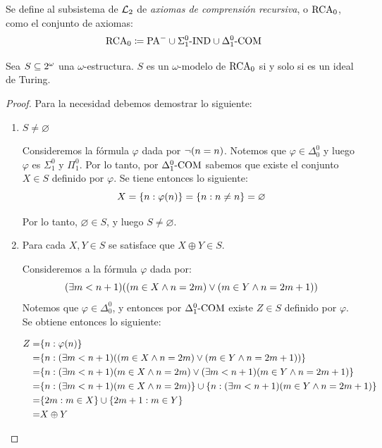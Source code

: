 \begin{definition}[$\RCA$]
	Se define al subsistema de $\mathcal{L}_{2}$ de \emph{axiomas de comprensión recursiva}, o $\RCA$, como el conjunto de axiomas:
	\[
		\mathrm{RCA}_{0}\coloneqq\mathrm{PA}^{-}\cup\Sigma_{1}^{0}\text{-}\mathrm{IND}\cup\Delta_{1}^{0}\text{-}\mathrm{COM}
	\]
\end{definition}

\begin{theorem}
	Sea $S\subseteq2^{\omega}$ una $\omega$-estructura. $S$ es un $\omega$-modelo de $\RCA$ si y solo si es un ideal de Turing.
\end{theorem}

\begin{proof}
	Para la necesidad debemos demostrar lo siguiente:

	\begin{enumerate}
		\item $S\neq\varnothing$

		Consideremos la fórmula $\varphi$ dada por $\neg\pa*{n = n}$. Notemos que $\varphi\in\Delta_{0}^{0}$ y luego $\varphi$ es $\Sigma_{1}^{0}$ y $\Pi_{1}^{0}$. Por lo tanto, por $\Delta_{1}^{0}\text{-}\mathrm{COM}$ sabemos que existe el conjunto $X\in S$ definido por $\varphi$. Se tiene entonces lo siguiente:
		\[
			X =\set*{n:\varphi\pa*{n}} =\set*{n: n\neq n} =\varnothing
		\]

		Por lo tanto, $\varnothing\in S$, y luego $S\neq\varnothing$.

		\item Para cada $X, Y\in S$ se satisface que $X\oplus Y\in S$.

		Consideremos a la fórmula $\varphi$ dada por:
		\[
			\pa*{\exists m < n + 1}\pa*{\pa*{m\in X\land n = 2m}\lor\pa*{m\in Y\land n = 2m + 1}}
		\]
		Notemos que $\varphi\in\Delta_{0}^{0}$, y entonces por $\Delta_{1}^{0}\text{-}\mathrm{COM}$ existe $Z\in S$ definido por $\varphi$. Se obtiene entonces lo siguiente:

		\begin{align*}
			Z =&\set*{n:\varphi\pa*{n}}\\
			=&\set*{n:\pa*{\exists m < n + 1}\pa*{\pa*{m\in X\land n = 2m}\lor\pa*{m\in Y\land n = 2m + 1}}}\\
			=&\set*{n:\pa*{\exists m < n + 1}\pa*{m\in X\land n = 2m}\lor\pa*{\exists m < n + 1}\pa*{m\in Y\land n = 2m + 1}}\\
			=&\set*{n:\pa*{\exists m < n + 1}\pa*{m\in X\land n = 2m}}\cup\set*{n:\pa*{\exists m < n + 1}\pa*{m\in Y\land n = 2m + 1}}\\
			=&\set*{2m: m\in X}\cup\set*{2m + 1: m\in Y}\\
			=& X\oplus Y
		\end{align*}


\end{enumerate}
\end{proof}
